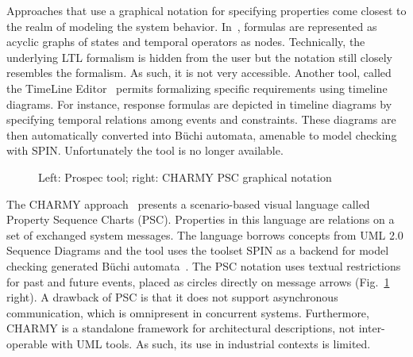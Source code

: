 \documentclass[letter]{llncs}
\begin{document}
Approaches that use a graphical notation for specifying properties
come closest to the realm of modeling the system behavior.
In~\cite{Lee97agraphical}, formulas are represented as acyclic graphs of
states and temporal operators as nodes.  Technically, the underlying LTL
formalism is hidden from the user but the notation still closely resembles
the formalism.  As such, it is not very accessible.  Another tool,
called the TimeLine Editor~\cite{Smith:2001:ECG:882477.883639} permits
formalizing specific requirements using timeline diagrams. For instance,
response formulas are depicted in timeline diagrams by specifying
temporal relations among events and constraints.  These diagrams are
then automatically converted into B\"uchi automata, amenable to model
checking with SPIN.  Unfortunately the tool is no longer available.
\begin{figure}[h!]
  \centering
  \hfill
  \caption{Left: Prospec tool; right: CHARMY PSC graphical notation}
  \label{fig:Approaches}
\end{figure}
The CHARMY approach~\cite{Autili:2007:GSS:1290845.1290859} presents
a scenario-based visual language called Property Sequence Charts
(PSC). Properties in this language are relations on a set of exchanged
system messages. The language borrows concepts from UML 2.0 Sequence
Diagrams and the tool uses the toolset SPIN as a backend for model checking
generated B\"uchi automata~\cite{Giannakopoulou:2001:AVT:872023.872506}.
The PSC notation uses textual restrictions for past and future events,
placed as circles directly on message arrows (Fig.~\ref{fig:Approaches}
right). A drawback of PSC is that it does not support asynchronous
communication, which is omnipresent in concurrent systems.  Furthermore,
CHARMY is a standalone framework for architectural descriptions, not
inter-operable with UML tools. As such, its use in industrial contexts
is limited.
\end{document}
